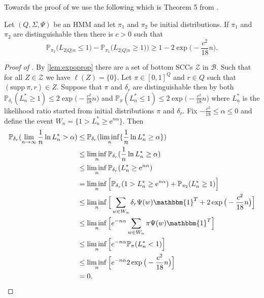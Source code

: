 \documentclass[a4paper,UKenglish,cleveref, autoref,mathscr]{lipics-v2019}
\newcommand{\PP}{\mathbb{P}}
\newcommand{\e}{\mathrm{e}}
\newcommand{\1}{\mathbbm{1}}
\newcommand{\supp}{\mathrm{supp}}
\begin{document}
\probexpzero*
Towards the proof of  we use the following which is Theorem 5 from \cite{kief16}.
\begin{lemma}\label{kief16thm5}
Let $(Q, \Sigma, \Psi)$ be an HMM and let $\pi_1$ and $\pi_2$ be initial distributions. If $\pi_1$ and $\pi_2$ are distinguishable then there is $c > 0$ such that
\begin{equation*}
\PP_{\pi_2}\Big( L_{2|Q|n} \leq 1 \Big) - \PP_{\pi_1}\Big( L_{2|Q|n} \geq 1 ) \Big) \geq 1 - 2\exp \big(-\frac{c^2}{18}n\big).
\end{equation*}
\end{lemma}

\begin{proof}[Proof of ]
By \cref{lem:expoprop} there are a set of bottom SCCs $\mathcal{Z}$ in $\mathcal{B}$. Such that for all $Z \in \mathcal{Z}$ we have $\ell(Z) = \{0\}$. Let $\pi \in [0,1]^Q$ and $r \in Q$ such that $(\supp~\pi, r) \in Z$. Suppose that $\pi$ and $\delta_r$ are distinguishable then by  both $\PP_{\delta_r}(L_n^* \geq 1) \leq 2\exp\big( -\frac{c^2}{18}n \big)$ and $\PP_{\pi}(L_n^* \leq 1) \leq 2\exp\big( -\frac{c^2}{18}n \big)$ where $L_n^*$ is the likelihood ratio started from initial distributions $\pi$ and $\delta_r$. Fix $-\frac{c^2}{18} \leq \alpha \leq 0$ and define the event $W_n = \{1 > L_n^* \geq \e^{n\alpha}\}$. Then
\begin{align*}
\PP_{\delta_r}(\lim_{n \rightarrow \infty} \frac1n \ln L_n^* > \alpha) & \leq \PP_{\delta_r}(\liminf_n \{\frac1n \ln L_n^* \geq \alpha\}) \\
& \leq \liminf_n \PP_{\delta_r}(\frac1n \ln L_n^* \geq \alpha) \\
& \leq \liminf_n \PP_{\delta_r}(L_n^* \geq \e^{n\alpha}) \\
& = \liminf_n \Big[ \PP_{\delta_r}(1 > L_n^* \geq \e^{n\alpha}) +  \PP_{\pi_2}(L_n^* \geq 1) \Big]\\
& \leq \liminf_n \Big[ \sum_{w \in W_n} \delta_r \Psi(w) \1^T + 2\exp\big( -\frac{c^2}{18}n \big) \Big]\\
& \leq \liminf_n \Big[ e^{-n\alpha} \sum_{w \in W_n} \pi \Psi(w) \1^T\Big]\\
& \leq \liminf_n \Big[ e^{-n\alpha} \PP_{\pi}(L_n^* < 1)\Big]\\
& \leq \liminf_n \Big[ e^{-n\alpha} 2\exp\big( -\frac{c^2}{18}n \big)\Big]\\
& = 0.
\end{align*}

\end{proof}
\end{document}
